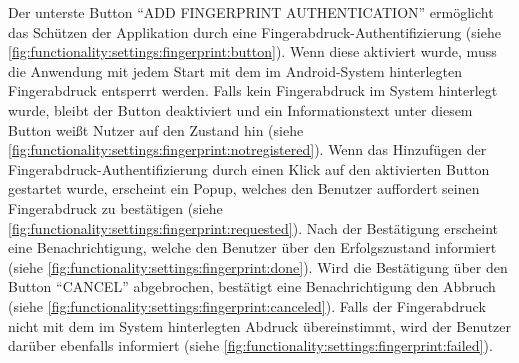 \documentclass[a4paper]{article}
\begin{document}
Der unterste Button "`ADD FINGERPRINT AUTHENTICATION"' ermöglicht das Schützen der Applikation durch eine Fingerabdruck-Authentifizierung (siehe \autoref{fig:functionality:settings:fingerprint:button}). Wenn diese aktiviert wurde, muss die Anwendung mit jedem Start mit dem im Android-System hinterlegten Fingerabdruck entsperrt werden. Falls kein Fingerabdruck im System hinterlegt wurde, bleibt der Button deaktiviert und ein Informationstext unter diesem Button weißt Nutzer auf den Zustand hin (siehe \autoref{fig:functionality:settings:fingerprint:notregistered}). Wenn das Hinzufügen der Fingerabdruck-Authentifizierung durch einen Klick auf den aktivierten Button gestartet wurde, erscheint ein Popup, welches den Benutzer auffordert seinen Fingerabdruck zu bestätigen (siehe \autoref{fig:functionality:settings:fingerprint:requested}). Nach der Bestätigung erscheint eine Benachrichtigung, welche den Benutzer über den Erfolgszustand informiert (siehe \autoref{fig:functionality:settings:fingerprint:done}). Wird die Bestätigung über den Button "`CANCEL"' abgebrochen, bestätigt eine Benachrichtigung den Abbruch (siehe \autoref{fig:functionality:settings:fingerprint:canceled}). Falls der Fingerabdruck nicht mit dem im System hinterlegten Abdruck übereinstimmt, wird der Benutzer darüber ebenfalls informiert (siehe \autoref{fig:functionality:settings:fingerprint:failed}).
\end{document}
